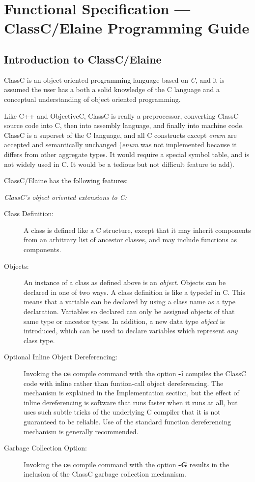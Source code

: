 \section{Functional Specification --- ClassC/Elaine Programming Guide}
\subsection{Introduction to ClassC/Elaine}
ClassC is an object oriented programming language based on
{\em C},
and it is assumed the user has a both a solid knowledge of the C
language and a conceptual understanding of object oriented programming.

Like C++ and ObjectiveC, ClassC is really a preprocessor, converting ClassC
source code into C, then into assembly language, and finally into machine
code.  ClassC is a superset of the C language, and all C constructs except
{\em enum} are accepted and semantically unchanged ({\em enum}
was not implemented because it differs from other aggregate types.  It would
require a special symbol table, and is not widely used in C.  It would
be a tedious but not difficult feature to add).

{\flushleft ClassC/Elaine has the following features:}

{\flushleft \large \em ClassC's object oriented extensions to C:}\\
\begin{description}
\item[Class Definition:]
A class is defined like a C structure, except that it may inherit
components from an arbitrary list of ancestor classes, and may include
functions as components.
\item[Objects:]
An instance of a class as defined above is an
{\em object}.
Objects can be declared in one of two ways.  A class definition is like a
typedef in C.  This means that a variable can be declared by using
a class name as a type declaration.  Variables so declared can only be
assigned objects of that same type or ancestor types.
In addition, a new data type
{\em object}
is introduced, which can be used to declare variables which represent
{\em any}
class type.
\item[Optional Inline Object Dereferencing:]
Invoking the {\bf ce} compile command with the option {\bf -i} compiles
the ClassC code with inline rather than funtion-call object dereferencing.
The mechanism is explained in the Implementation section, but the
effect of inline dereferencing is software that runs faster when it runs at
all, but uses such subtle tricks of the underlying C compiler
that it is not guaranteed to be reliable.  Use of the standard function
dereferencing mechanism is generally recommended.
\item[Garbage Collection Option:]
Invoking the {\bf ce} compile command with the option {\bf -G} results in the
inclusion of the ClassC garbage collection mechanism.
\end{description}

